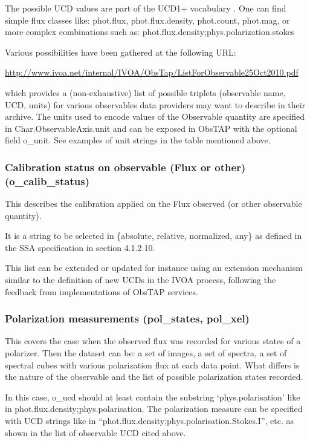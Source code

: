 \documentclass[11pt,a4paper]{ivoa}
\begin{document}
The possible UCD values are part of the UCD1+ vocabulary \citep{2007ivoa.spec.0402P} . One can find simple flux classes
like: phot.flux, phot.flux.density, phot.count, phot.mag, or more complex combinations such as:
phot.flux.density;phys.polarization.stokes

Various possibilities have been gathered at the following URL:

\url{http://www.ivoa.net/internal/IVOA/ObsTap/ListForObservable25Oct2010.pdf}  

which provides a (non-exhaustive) list of possible triplets (observable name, UCD, units) for various observables data
providers may want to describe in their archive. The units used to encode values of the Observable quantity are
specified in Char.ObservableAxis.unit and can be exposed in ObsTAP with the optional field o\_unit. See examples of
unit strings in the table mentioned above.

\subsubsection{Calibration status on observable (Flux or other) (o\_calib\_status)}
This describes the calibration applied on the Flux observed (or other observable quantity).

It is a string to be selected in \{absolute, relative, normalized, any\} as defined in the SSA specification 
\citep{2012ivoa.spec.0210T} in section 4.1.2.10.

This list can be extended or updated for instance using an extension mechanism similar to the definition of new UCDs in
the IVOA process, following the feedback from implementations of ObsTAP services. 

\subsubsection{Polarization measurements (pol\_states, pol\_xel)}
\label{bkm:Ref482804077}\label{bkm:Ref482802717}This covers the case when the observed flux was recorded for various
states of a polarizer. Then the dataset can be: a set of images, a set of spectra, a set of spectral cubes with various
polarization flux at each data point. What differs is the nature of the observable and the list of possible
polarization states recorded.

In this case, o\_ucd should at least contain the substring `phys.polarisation' like in
{\textquotedbl}phot.flux.density;phys.polarisation{\textquotedbl}. The polarization measure can be specified with UCD
strings like in ``phot.flux.density;phys.polarisation.Stokes.I'', etc. as shown in the list of observable UCD cited
above.
\end{document}

